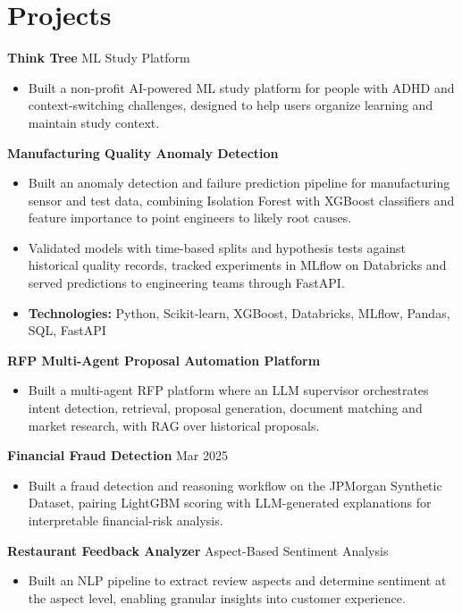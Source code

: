 \documentclass[10pt,a4paper]{article}
\begin{document}
\section{Projects}
\textbf{Think Tree} \textbar{} ML Study Platform\par
\begin{itemize}
  \item Built a non-profit AI-powered ML study platform for people with ADHD and context-switching challenges, designed to help users organize learning and maintain study context.
\end{itemize}
\textbf{Manufacturing Quality Anomaly Detection}\par
\begin{itemize}
  \item Built an anomaly detection and failure prediction pipeline for manufacturing sensor and test data, combining Isolation Forest with XGBoost classifiers and feature importance to point engineers to likely root causes.
  \item Validated models with time-based splits and hypothesis tests against historical quality records, tracked experiments in MLflow on Databricks and served predictions to engineering teams through FastAPI.
  \item \textbf{Technologies:} Python, Scikit-learn, XGBoost, Databricks, MLflow, Pandas, SQL, FastAPI
\end{itemize}
\textbf{RFP Multi-Agent Proposal Automation Platform}\par
\begin{itemize}
  \item Built a multi-agent RFP platform where an LLM supervisor orchestrates intent detection, retrieval, proposal generation, document matching and market research, with RAG over historical proposals.
\end{itemize}
\textbf{Financial Fraud Detection} \textbar{} Mar 2025\par
\begin{itemize}
  \item Built a fraud detection and reasoning workflow on the JPMorgan Synthetic Dataset, pairing LightGBM scoring with LLM-generated explanations for interpretable financial-risk analysis.
\end{itemize}
\textbf{Restaurant Feedback Analyzer} \textbar{} Aspect-Based Sentiment Analysis\par
\begin{itemize}
  \item Built an NLP pipeline to extract review aspects and determine sentiment at the aspect level, enabling granular insights into customer experience.
\end{itemize}
\end{document}
